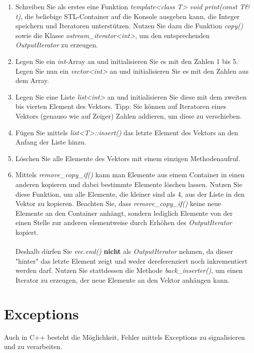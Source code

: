 \documentclass[
  accentcolor=tud1c,	%
  colorbacktitle,		%
  inverttitle,			%
  german,				%
  twoside
]{tudexercise}
\begin{document}
\begin{enumerate}
\item Schreiben Sie als erstes eine Funktion \emph{template<class T> void print(const T\& t)}, die beliebige STL-Container auf die Konsole ausgeben kann, die Integer speichern und Iteratoren unterstützen. Nutzen Sie dazu die Funktion \emph{copy()} sowie die Klasse \emph{ostream\_iterator<int>}, um den entsprechenden \emph{OutputIterator} zu erzeugen.

\item Legen Sie ein \emph{int}-Array an und initialisieren Sie es mit den Zahlen 1 bis 5. Legen Sie nun ein \emph{vector<int>} an und initialisieren Sie es mit den Zahlen aus dem Array.

\item Legen Sie eine Liste \emph{list<int>} an und initialisieren Sie diese mit dem zweiten bis vierten Element des Vektors. Tipp: Sie können auf Iteratoren eines Vektors (genauso wie auf Zeiger) Zahlen addieren, um diese zu verschieben.

\item Fügen Sie mittels \emph{list<T>::insert()} das letzte Element des Vektors an den Anfang der Liste hinzu.

\item Löschen Sie alle Elemente des Vektors mit einem einzigen Methodenaufruf.

\item Mittels \emph{remove\_copy\_if()} kann man Elemente aus einem Container in einen anderen kopieren und dabei bestimmte Elemente löschen lassen. Nutzen Sie diese Funktion, um alle Elemente, die kleiner sind als 4, aus der Liste in den Vektor zu kopieren. Beachten Sie, dass \emph{remove\_copy\_if()} keine neue Elemente an den Container anhängt, sondern lediglich Elemente von der einen Stelle zur anderen elementweise durch Erhöhen des \emph{OutputIterator} kopiert. \\\\
Deshalb dürfen Sie \emph{vec.end()} \textbf{nicht} als \emph{OutputIterator} nehmen, da dieser "{}hinter"{} das letzte Element zeigt und weder dereferenziert noch inkrementiert werden darf. Nutzen Sie stattdessen die Methode \emph{back\_inserter()}, um einen Iterator zu erzeugen, der neue Elemente an den Vektor anhängen kann.
\end{enumerate}

\section{Exceptions}
Auch in C++ besteht die Möglichkeit, Fehler mittels Exceptions zu signalisieren und zu verarbeiten.
\end{document}
